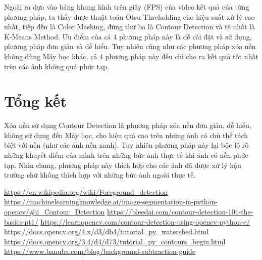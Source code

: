 \documentclass[conference]{IEEEtran}
\begin{document}
Ngoài ra dựa vào bảng khung hình trên giây (FPS) của video kết quả của từng phương pháp, ta thấy được thuật toán Otsu Threholding cho hiệu suất xử lý cao nhất, tiếp đến là Color Masking, đứng thứ ba là Contour Detection và tệ nhất là K-Means Method.
Ưu điểm của cả 4 phương pháp này là dễ cài đặt và sử dụng, phương pháp đơn giản và dễ hiểu. Tuy nhiên cũng như các phương pháp xóa nền không dùng Máy học khác, cả 4 phương pháp này đều chỉ cho ra kết quả tốt nhất trên các ảnh không quá phức tạp.
\section{Tổng kết}
 Xóa nền sử dụng Contour Detection là phương pháp xóa nền đơn giản, dễ hiểu, không sử dụng đến Máy học, cho hiệu quả cao trên những ảnh có chủ thể tách biệt với nền (như các ảnh nền xanh). Tuy nhiên phương pháp này lại bộc lộ rõ những khuyết điểm của mình trên những bức ảnh thực tế khi ảnh có nền phức tạp. Nhìn chung, phương pháp này thích hợp cho các ảnh đã được xử lý hậu trường chứ không thích hợp với những bức ảnh ngoài thực tế. 
\begin{thebibliography}{00}
 \url{https://en.wikipedia.org/wiki/Foreground_detection}
 \url{https://machinelearningknowledge.ai/image-segmentation-in-python-opencv/#ii_Contour_Detection}
 \url{https://bleedai.com/contour-detection-101-the-basics-pt1/}
 \url{https://learnopencv.com/contour-detection-using-opencv-python-c/}
 \url{https://docs.opencv.org/4.x/d3/db4/tutorial_py_watershed.html}
 \url{https://docs.opencv.org/3.4/d4/d73/tutorial_py_contours_begin.html}
 \url{https://www.banuba.com/blog/background-subtraction-guide}
\end{thebibliography}
\end{document}
